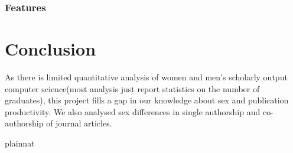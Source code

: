 \documentclass[bsc,frontabs,twoside,singlespacing,parskip,deptreport]{infthesis}     %
\begin{document}
\subsection{Features}

\chapter{Conclusion}
As there is limited quantitative analysis of women and
men's scholarly output computer science(most analysis just report statistics on the number of graduates), this project
fills a gap in our knowledge about sex and publication productivity. We also analysed sex differences in single authorship and co-authorship
of journal articles.

 {plainnat}

\end{document}
